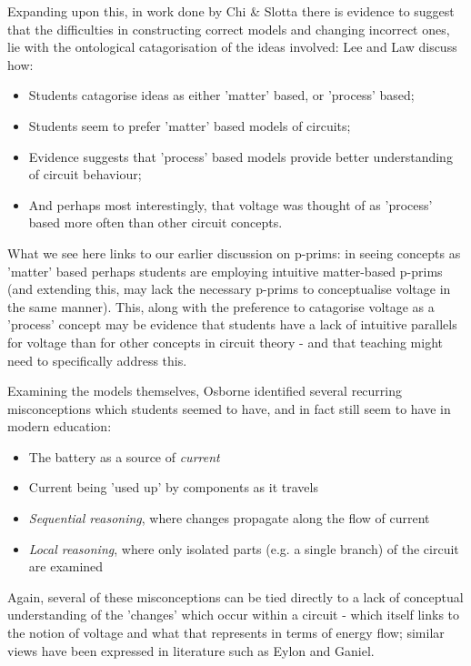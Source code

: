 \documentclass[a4paper,openany,nobib]{tufte-book}
\begin{document}
Expanding upon this, in work done by Chi \& Slotta\autocite{slotta} there is evidence to suggest that the difficulties in constructing correct models and changing incorrect ones, lie with the ontological catagorisation of the ideas involved: Lee and Law\autocite{lee2001} discuss how:
\begin{itemize}
	\item Students catagorise ideas as either 'matter' based, or 'process' based;
	\item Students seem to prefer 'matter' based models of circuits;
	\item Evidence suggests that 'process' based models provide better understanding of circuit behaviour;
	\item And perhaps most interestingly, that voltage was thought of as 'process' based more often than other circuit concepts.
\end{itemize}
What we see here links to our earlier discussion on p-prims:
in seeing concepts as 'matter' based perhaps students are employing intuitive matter-based p-prims (and extending this, may lack the necessary p-prims to conceptualise voltage in the same manner). This, along with the preference to catagorise voltage as a 'process' concept may be evidence that students have a lack of intuitive parallels for voltage than for other concepts in circuit theory - and that teaching might need to specifically address this.

Examining the models themselves, Osborne\autocite{osb} identified several recurring misconceptions which students seemed to have, and in fact still seem to {have in modern education\autocite{suryadi2020}}:
\begin{itemize}
	\item The battery as a source of \emph{current} 
	\item Current being 'used up' by components as it travels
	\item \emph{Sequential reasoning}, where changes propagate along the flow of current
	\item \emph{Local reasoning}, where only isolated parts (e.g. a single branch) of the circuit are examined
\end{itemize}
Again, several of these misconceptions can be tied directly to a lack of conceptual understanding of the 'changes' which occur within a circuit - which itself links to the notion of voltage and what that represents in terms of energy flow; similar views have been expressed in literature such as Eylon and {Ganiel\autocite{eylon1990}}.
\end{document}
